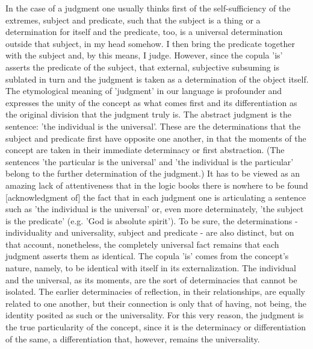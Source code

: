 In the case of a judgment one usually thinks first of
the self-sufficiency of the extremes, subject and predicate,
such that the subject is a thing or a determination for itself and
the predicate, too, is a universal determination outside that subject, in my head somehow.
I then bring the predicate together with the subject and, by this means, I judge.
However, since the copula 'is' asserts the predicate of the subject,
that external, subjective subsuming is sublated in turn and
the judgment is taken as a determination of the object itself.
The etymological meaning of 'judgment' in our language is
profounder and expresses the unity of the concept as what comes first and
its differentiation as the original division that the judgment truly is.
The abstract judgment is the sentence: 'the individual is the universal'.
These are the determinations that the subject and predicate
first have opposite one another, in that the moments of the concept are
taken in their immediate determinacy or first abstraction.
(The sentences 'the particular is the universal' and
'the individual is the particular' belong to
the further determination of the judgment.)
It has to be viewed as an amazing lack of attentiveness that
in the logic books there is nowhere to be found [acknowledgment of]
the fact that in each judgment one is articulating a sentence such as
'the individual is the universal' or, even more determinately,
'the subject is the predicate' (e.g. 'God is absolute spirit').
To be sure, the determinations - individuality and universality,
subject and predicate - are also distinct, but on that account,
nonetheless, the completely universal fact remains that
each judgment asserts them as identical.
The copula 'is' comes from the concept's nature, namely,
to be identical with itself in its externalization.
The individual and the universal, as its moments, are
the sort of determinacies that cannot be isolated.
The earlier determinacies of reflection, in their relationships,
are equally related to one another, but their connection is only
that of having, not being, the identity posited as such or the universality.
For this very reason, the judgment is the true particularity of the concept,
since it is the determinacy or differentiation of the same,
a differentiation that, however, remains the universality.

